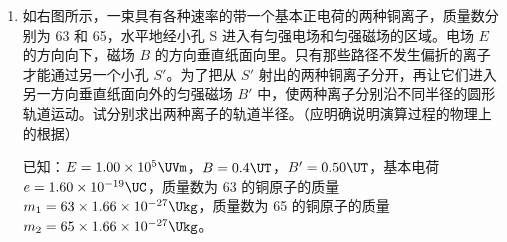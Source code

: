 \documentclass[\gkver]{gaokaozhenti}
\begin{document}
\begin{enumerate}
{评分说明：全题 10 分。（1）2 分，（2）4 分，（3）4 分。

（2）中，只找出相似三角形并列出①、②式的给 1 分，进一步导出③式的，再给 2 分。

（3）中，只找出 $v$ 为正负值的条件的，给 2 分；没有找出上述条件，只是写出 $v$ 为正值时成实像、$v$ 为负值时成虚像的，给 2 分。
}

\item
如右图所示，一束具有各种速率的带一个基本正电荷的两种铜离子，质量数分别为 63 和 65，水平地经小孔 S 进入有匀强电场和匀强磁场的区域。电场 $E$ 的方向向下，磁场 $B$ 的方向垂直纸面向里。只有那些路径不发生偏折的离子才能通过另一个小孔 $S'$。为了把从 $S'$ 射出的两种铜离子分开，再让它们进入另一方向垂直纸面向外的匀强磁场 $B'$ 中，使两种离子分别沿不同半径的圆形轨道运动。试分别求出两种离子的轨道半径。（应明确说明演算过程的物理上的根据）

已知：$E=1.00\times10^{5}\UVm$，$B=0.4\UT$，$B'=0.50\UT$，基本电荷 $e=1.60\times10^{-19}\UC$，质量数为 63 的铜原子的质量 $m_{1}=63\times1.66\times10^{-27}\Ukg$，质量数为 65 的铜原子的质量 $m_{2}=65\times1.66\times10^{-27}\Ukg$。

\end{enumerate}
\end{document}
